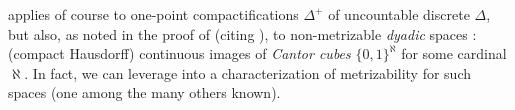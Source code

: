 \documentclass[11pt,leqno]{article}
\theoremstyle{plain}
\theoremstyle{plain}
\theoremstyle{plain}
\numberwithin{equation}{section}
\theoremstyle{nonumberplain}
\newcommand\1{{\bf 1}}
\begin{document}

 applies of course to one-point compactifications $\Delta^+$ of uncountable discrete $\Delta$, but also, as noted in the proof of \cite[Theorem 2]{zbMATH03569401} (citing \cite[p. 499, Proof of Theorem4]{zbMATH03209749}), to non-metrizable {\it dyadic} spaces \cite[Definition A4.30]{hm5}: (compact Hausdorff) continuous images of {\it Cantor cubes} $\{0,1\}^{\aleph}$ for some cardinal $\aleph$. In fact, we can leverage  into a characterization of metrizability for such spaces (one among the many others known).
\end{document}
